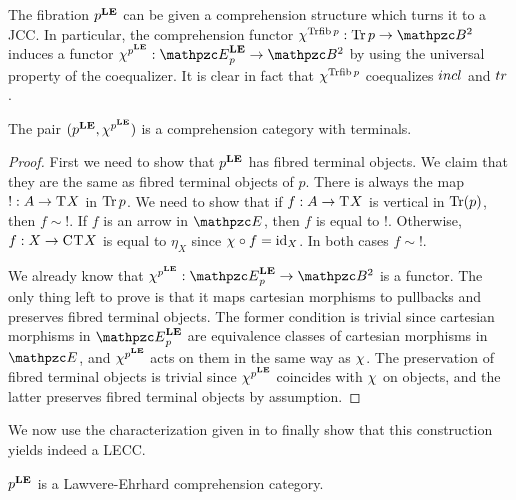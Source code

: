\documentclass{lmcs} %
\theoremstyle{plain}\newtheorem{satz}[thm]{Satz} %
\begin{document}
			The fibration ${p}^{\mathbf{LE}}$ can be given a comprehension structure which turns it to a JCC. In particular, the comprehension functor $\jcomp{\Trfib{p}}:\Tr{p}\to\Arr{\ct{B}}$ induces a functor $\jcomp{\LEFib{p}}:\LEDomE{p}\to\Arr{\ct{B}}$ by using the universal property of the coequalizer. It is clear in fact that $\chi^{\mathop{\mathrm{Trfib}}\nolimits p}$ coequalizes $incl$ and $tr$.

			\begin{prop}
				The pair $({p}^{\mathbf{LE}}, \chi^{{p}^{\mathbf{LE}}})$ is a comprehension category with terminals.
			\end{prop}
			
			\begin{proof}
				First we need to show that ${p}^{\mathbf{LE}}$ has fibred terminal objects. We claim that they are the same as fibred terminal objects of $p$. There is always the map $!:A\to \mathrm{T}^{}X$ in $\mathop{\mathrm{Tr}}\nolimits{p}$. We need to show that if $f:A\to\mathrm{T}^{}X$ is vertical in $\mathop{\mathrm{Tr}}\nolimits(p)$, then $f\sim !$. If $f$ is an arrow in $\ct{E}$, then $f$ is equal to $!$. Otherwise, $f:X\to \mathrm{C}^{}\mathrm{T}^{}X$ is equal to $\eta_X$ since $\chi^{}\circ f=\mathrm{id}_{X}$. In both cases $f\sim !$.
				
				We already know that $\jcomp{\LEFib{p}}:\LEDomE{p}\to\Arr{\ct{B}}$ is a functor. The only thing left to prove is that it maps cartesian morphisms to pullbacks and preserves fibred terminal objects. The former condition is trivial since cartesian morphisms in $\LEDomE{p}$ are equivalence classes of cartesian morphisms in $\ct{E}$, and $\chi^{{p}^{\mathbf{LE}}}$ acts on them in the same way as $\chi^{}$.
				The preservation of fibred terminal objects is trivial since $\chi^{{p}^{\mathbf{LE}}}$ coincides with $\chi^{}$ on objects, and the latter preserves fibred terminal objects by assumption.
			\end{proof}
			
			We now use the characterization given in  to finally show that this construction yields indeed a LECC.
			
			\begin{prop}
				${p}^{\mathbf{LE}}$ is a Lawvere-Ehrhard comprehension category. 
			\end{prop}
			
\end{document}
